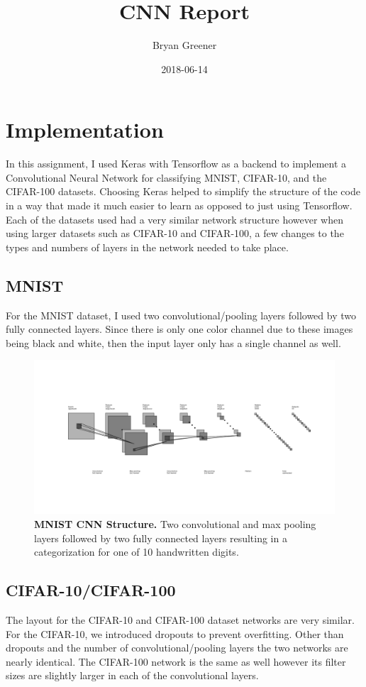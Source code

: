 \documentclass{report}
\title{CNN Report}
\author{Bryan Greener}
\date{2018-06-14}
\theoremstyle{plain} %
\theoremstyle{definition} %
\theoremstyle{plain} %
\begin{document}
\maketitle
\section{Implementation}
In this assignment, I used Keras with Tensorflow as a backend to implement a Convolutional Neural Network for classifying MNIST, CIFAR-10, and the CIFAR-100 datasets. Choosing Keras helped to simplify the structure of the code in a way that made it much easier to learn as opposed to just using Tensorflow. Each of the datasets used had a very similar network structure however when using larger datasets such as CIFAR-10 and CIFAR-100, a few changes to the types and numbers of layers in the network needed to take place.
\subsection{MNIST}
For the MNIST dataset, I used two convolutional/pooling layers followed by two fully connected layers. Since there is only one color channel due to these images being black and white, then the input layer only has a single channel as well.
\begin{figure}[h]
\includegraphics[width=\textwidth]{mnist}
\caption{\textbf{MNIST CNN Structure.} Two convolutional and max pooling layers followed by two fully connected layers resulting in a categorization for one of 10 handwritten digits.}
\centering
\end{figure}

\subsection{CIFAR-10/CIFAR-100}
The layout for the CIFAR-10 and CIFAR-100 dataset networks are very similar. For the CIFAR-10, we introduced dropouts to prevent overfitting. Other than dropouts and the number of convolutional/pooling layers the two networks are nearly identical. The CIFAR-100 network is the same as well however its filter sizes are slightly larger in each of the convolutional layers.
\end{document}
